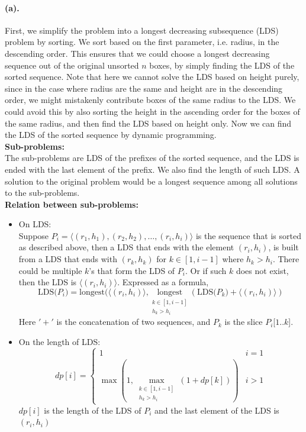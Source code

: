 \documentclass[12pt]{article}
\begin{document}
\paragraph{(a).}
First, we simplify the problem into a longest decreasing subsequence (LDS) problem by sorting. We sort based on the first parameter, i.e. radius, in the descending order. This ensures that we could choose a longest decreasing sequence out of the original unsorted \(n\) boxes, by simply finding the LDS of the sorted sequence. Note that here we cannot solve the LDS based on height purely, since in the case where radius are the same and height are in the descending order, we might mistakenly contribute boxes of the same radius to the LDS. We could avoid this by also sorting the height in the ascending order for the boxes of the same radius, and then find the LDS based on height only.
Now we can find the LDS of the sorted sequence by dynamic programming. \\
\textbf{Sub-problems:}\\ The sub-problems are LDS of the prefixes of the sorted sequence, and the LDS is ended with the last element of the prefix. We also find the length of such LDS. A solution to the original problem would be a longest sequence among all solutions to the sub-problems.\\
\textbf{Relation between sub-problems:}
\begin{itemize}
     \setlength \itemsep{0em} 
     \item On LDS:\\
     Suppose \(P_i = \langle(r_1,h_1), (r_2, h_2), \hdots, (r_i, h_i)\rangle\) is the sequence that is sorted as described above, then a LDS that ends with the element \((r_i, h_i)\), is built from a LDS that ends with \((r_k, h_k)\) for \(k \in [1, i-1]\) where \(h_k > h_i\). There could be multiple \(k\)'s that form the LDS of \(P_i\). Or if such \(k\) does not exist, then the LDS is \(\langle(r_i, h_i)\rangle\). Expressed as a formula, 
     \begin{equation*}
          \text{LDS(\(P_i\))} = \text{longest}(\langle(r_i, h_i)\rangle, \underset{\substack{k \in [1, i-1] \\ h_k > h_i}}{\text{longest}}(\text{LDS(\(P_k\))} + \langle(r_i, h_i)\rangle)
     \end{equation*}
   Here \('+'\) is the concatenation of two sequences, and \(P_k\) is the slice \(P_i\)[\(1 .. k\)].
     \item On the length of LDS:
     \begin{equation*}
          dp[i] = 
          \begin{cases}
               1 & i = 1 \\
               \max (1, \displaystyle\max_{\substack{k \in [1, i-1] \\  h_k > h_i}}(1 + dp[k])) & i > 1
          \end{cases}
     \end{equation*}
     \(dp[i]\) is the length of the LDS of \(P_i\) and the last element of the LDS is \((r_i, h_i)\)
\end{itemize}
 
\end{document}
